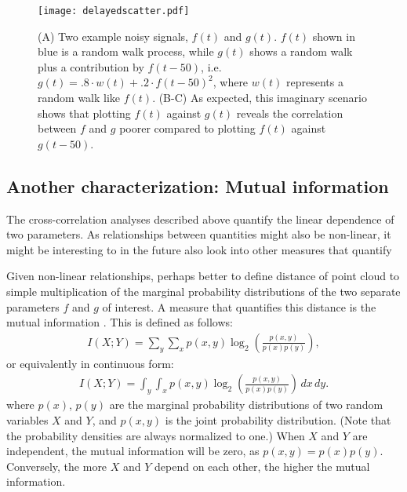 {\begin{figure}
	\centering
	\texttt{[image: delayedscatter.pdf]}
	\caption{ 
		(A) Two example noisy signals, $f(t)$ and $g(t)$. $f(t)$ shown in blue is a random walk process, while $g(t)$ shows a random walk plus a contribution by $f(t-50)$, i.e. $g(t)=.8\cdot w(t)+.2\cdot f(t-50)^2$, where $w(t)$ represents a random walk like $f(t)$.
		(B-C) As expected, this imaginary scenario shows that plotting $f(t)$ against $g(t)$ reveals the correlation between $f$ and $g$ poorer compared to plotting $f(t)$ against $g(t-50)$.
	}
	\label{fig:mm:delayedscatter}
\end{figure}


\subsection{Another characterization: Mutual information}

The cross-correlation analyses described above quantify the linear dependence of two parameters. 
%
As relationships between quantities might also be non-linear, it might be interesting to in the future also look into other measures that quantify 

Given non-linear relationships, perhaps better to define distance of point cloud to simple multiplication of the marginal probability distributions of the two separate parameters $f$ and $g$ of interest.
A measure that quantifies this distance is the mutual information \cite{Shannon1948, Bishop2006, WikipediaMutual2017}. This is defined as follows:
%
\begin{align}
	I(X;Y) = 
	\sum_{y} { \sum_{x} { p(x,y) \log_2 \left( \frac{p(x,y)}{p(x)p(y)} \right) }},
\end{align}
or equivalently in continuous form:
\begin{align}
	I(X;Y) = 
	\int_{y} { \int_{x} { p(x,y) \log_2 \left( \frac{p(x,y)}{p(x)p(y)} \right) 
			\,dx\,dy}}
	.
\end{align}
where $p(x)$, $p(y)$ are the marginal probability distributions of two random variables $X$ and $Y$, and $p(x,y)$ is the joint probability distribution. (Note that the probability densities are always normalized to one.)
%
%
When $X$ and $Y$ are independent, the mutual information will be zero, as $p(x,y)=p(x)p(y)$. Conversely, the more $X$ and $Y$ depend on each other, the higher the mutual information.


}
